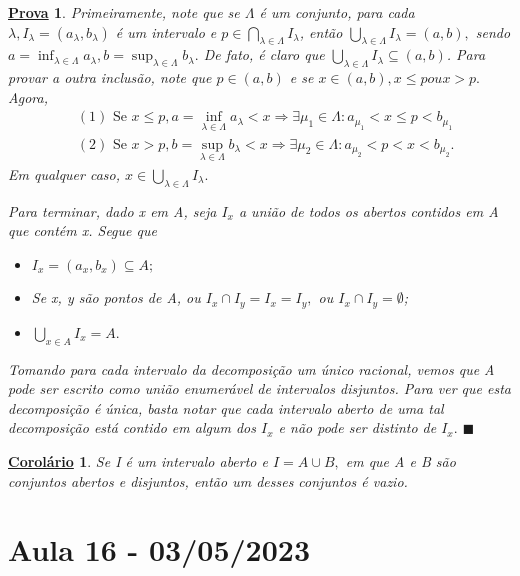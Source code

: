 \documentclass{article}
\newtheorem*{proof*}{\underline{Prova}}
\newtheorem*{crl*}{\underline{Corol\'ario}}
\renewcommand\qedsymbol{$\blacksquare$}
\begin{document}
\begin{proof*}
  Primeiramente, note que se $\Lambda $ \'e um conjunto, para cada $\lambda, I_{\lambda }=(a_{\lambda }, b_{\lambda })$ \'e um intervalo
  e $p\in\bigcap_{\lambda \in\Lambda }^{}{I_{\lambda }}$, ent\~ao $\bigcup_{\lambda \in\Lambda }^{}{I_{\lambda }}=(a, b),$ sendo
  $a = \inf_{\lambda \in\Lambda }a_{\lambda }, b = \sup_{\lambda \in\Lambda }b_{\lambda }.$ De fato, \'e claro que $\bigcup_{\lambda \in\Lambda }^{}{I_{\lambda }}\subseteq{(a, b)}$.
  Para provar a outra inclus\~ao, note que $p\in(a, b)$ e se $x\in(a, b), x\leq p ou x > p.$ Agora, 
 \begin{align*}
   &(1) \text{ Se }  x\leq p, a = \inf_{\lambda \in\Lambda }a_{\lambda } < x \Rightarrow \exists \mu_{1}\in\Lambda: a_{\mu_{1}}<x\leq p < b_{\mu_{1}}\\
   &(2) \text{ Se } x > p, b=\sup_{\lambda \in\Lambda }b_{\lambda } < x \Rightarrow \exists \mu_{2}\in\Lambda: a_{\mu_{2}} < p < x < b_{\mu_{2}}.
 \end{align*}
  Em qualquer caso,  $x\in \bigcup_{\lambda \in\Lambda }^{}{I_{\lambda }}.$

  Para terminar, dado x em A, seja $I_{x}$ a uni\~ao de todos os abertos contidos em A que cont\'em x. Segue que 
 \begin{itemize}
   \item[1)] $I_{x} = (a_{x}, b_{x})\subseteq{A};$
   \item[2)] Se x, y s\~ao pontos de A, ou $I_{x}\cap I_{y}=I_{x} = I_{y},$ ou $I_{x}\cap I_{y} = \emptyset$;
   \item[3)] $\bigcup_{x\in A}^{}{I_{x}} = A.$
 \end{itemize}
 Tomando para cada intervalo da decomposi\c c\~ao um \'unico racional, vemos que A pode ser escrito como uni\~ao enumer\'avel de
 intervalos disjuntos. Para ver que esta decomposi\c c\~ao \'e \'unica, basta notar que cada intervalo aberto de uma tal decomposi\c c\~ao
 est\'a contido em algum dos $I_{x}$ e n\~ao pode ser distinto de $I_{x}.$ \qedsymbol
\end{proof*}
\begin{crl*}
  Se I \'e um intervalo aberto e $I = A\cup B,$ em que A e B s\~ao conjuntos abertos e disjuntos, ent\~ao um desses conjuntos \'e vazio.
\end{crl*}
\newpage

\section{Aula 16 - 03/05/2023}
\end{document}

